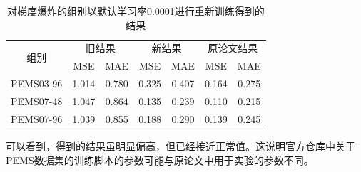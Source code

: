 \documentclass[twoside,12pt]{article}
\begin{document}
\begin{table}[htbp]
  \caption{\small{对梯度爆炸的组别以默认学习率0.0001进行重新训练得到的结果}}
  \label{tab:result_fix}
  \vspace{5pt}
  \centering
  \begin{tabular}{c|cc|cc|cc}
    \toprule
    \multirow{2}{*}{组别} & \multicolumn{2}{c|}{旧结果} & \multicolumn{2}{c|}{新结果} & \multicolumn{2}{c|}{原论文结果}                         \\
    \cmidrule(lr){2-3} \cmidrule(lr){4-5} \cmidrule(lr){6-7}
                          & MSE                         & MAE                         & MSE                             & MAE   & MSE   & MAE   \\
    \midrule
    PEMS03-96             & 1.014                       & 0.780                       & 0.325                           & 0.407 & 0.164 & 0.275 \\
    PEMS07-48             & 1.047                       & 0.864                       & 0.135                           & 0.239 & 0.110 & 0.215 \\
    PEMS07-96             & 1.039                       & 0.855                       & 0.188                           & 0.290 & 0.139 & 0.245 \\
    \bottomrule
  \end{tabular}
\end{table}

可以看到，得到的结果虽明显偏高，但已经接近正常值。这说明官方仓库中关于PEMS数据集的训练脚本的参数可能与原论文中用于实验的参数不同。
\end{document}
